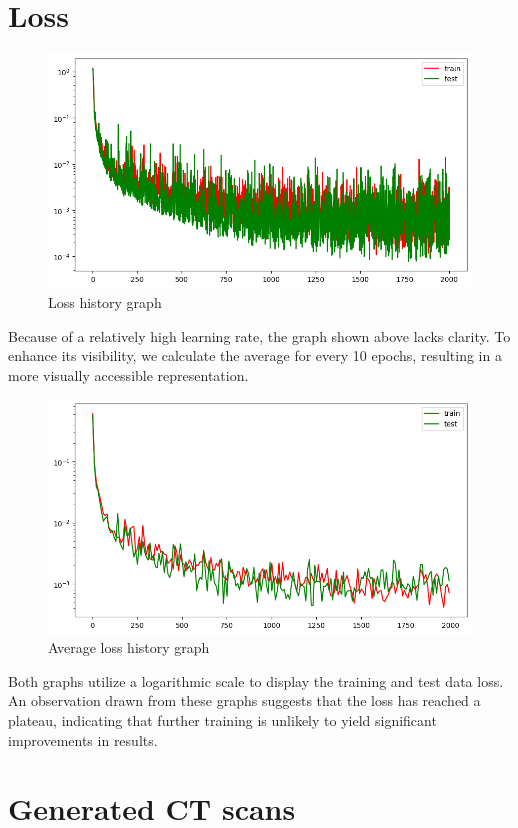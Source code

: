 \documentclass[11pt,a4paper]{report}
\begin{document}
\section{Loss}
\begin{figure}[H]
	\centering
	\includegraphics[scale=0.6]{images/loss}
    \caption{Loss history graph}
\end{figure}
Because of a relatively high learning rate, the graph shown above lacks clarity. To enhance its visibility, we calculate the average for every 10 epochs, resulting in a more visually accessible representation.
\begin{figure}[H]
	\centering
	\includegraphics[scale=0.6]{images/loss_10}
    \caption{Average loss history graph}
\end{figure}
Both graphs utilize a logarithmic scale to display the training and test data loss. An observation drawn from these graphs suggests that the loss has reached a plateau, indicating that further training is unlikely to yield significant improvements in results.

\section{Generated CT scans}
\end{document}

